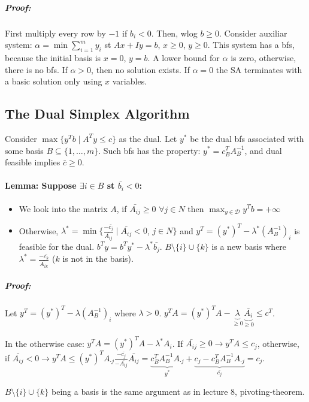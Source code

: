 \documentclass[main]{subfiles}
\begin{document}
\subparagraph{Proof:}
First multiply every row by $-1$ if $b_i < 0$. Then, wlog $b \geq 0$.
Consider auxiliar system: $\alpha = \min \sum_{i=1}^{m} y_i$ st $ Ax + Iy = b$,
$x \geq 0$, $y \geq 0$. This system has a bfs, because the initial basis is
$x = 0$, $y = b$. A lower bound for $\alpha$ is zero, otherwise, there is no
bfs. If $\alpha > 0$, then no solution exists. If $\alpha = 0$ the SA
terminates with a basic solution only using $x$ variables.

\subsection{The Dual Simplex Algorithm}

Consider $\max \{y^T b \mid A^T y \leq c \}$ as the dual. Let $y^*$ be the dual
bfs associated with some basis $B \subseteq \{1, \dots, m\}$. Such bfs has the
property: $y^* = c^T_B A^{-1}_B$, and dual feasible implies $\bar{c} \geq 0$.

\paragraph{Lemma: Suppose $\exists i \in B$ st $\bar{b_i} < 0$:}
\begin{itemize}
\item We look into the matrix $A$, if $\bar{A_{ij}} \geq 0$ $\forall j \in N$
then $\displaystyle \max_{y \in \mathcal{D}} y^{T} b = + \infty$
\item Otherwise, $\lambda^* = \min \{\frac{-\bar{c_j}}{\bar{A_{ij}}} \mid
\bar{A_{ij}} < 0$, $j \in N \}$ and $y^T = (y^*)^T - \lambda^* (A^{-1}_B)_i$ is
feasible for the dual. $b^T y = b^T y^* - \lambda^* \bar{b_j}$.
$B \setminus \{i\} \cup \{k\}$ is a new basis where $\lambda^* =
\frac{-\bar{c_k}}{\bar{A_{ik}}}$ ($k$ is not in the basis).
\end{itemize}

\subparagraph{Proof:}
Let $y^T = (y^*)^T - \lambda (A^{-1}_B)_i$ where $\lambda > 0$.
$y^T A = (y^*)^T  A - \underbrace{\lambda}_{\geq 0}
\underbrace{\bar{A_i}}_{\geq 0} \leq c^T$.

In the otherwise case: $y^T A = (y^*)^T  A - \lambda^* A_i$. If $\bar{A_{ij}}
\geq 0 \rightarrow y^T A \leq c_j$, otherwise, if $\bar{A_{ij}} < 0 \rightarrow
y^T A \leq (y^*)^T A_{\cdot j} \frac{-\bar{c_j}}{-\bar{A_{ij}}} \bar{A_{ij}} =
\underbrace{c^T_B A^{-1}_B A_{\cdot j}}_{y^*} +
\underbrace{c_j - c^T_B A^{-1}_B A_{\cdot j}}_{\bar{c_j}} = c_j$.

$B\setminus \{i\} \cup \{k\}$ being a basis is the same argument as in lecture
8, pivoting-theorem.
\end{document}
